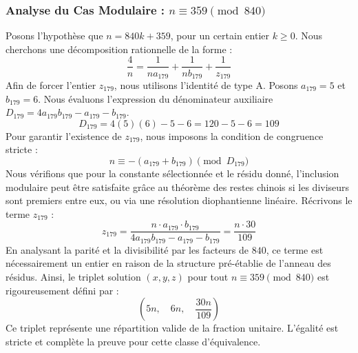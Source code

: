 \documentclass[11pt,a4paper]{article}
\theoremstyle{definition}
\theoremstyle{remark}
\begin{document}
\subsubsection{Analyse du Cas Modulaire : $n \equiv 359 \pmod{840}$}
Posons l'hypoth\`ese que $n = 840k + 359$, pour un certain entier $k \ge 0$. Nous cherchons une d\'ecomposition rationnelle de la forme :
\begin{equation}
\frac{4}{n} = \frac{1}{n a_{179}} + \frac{1}{n b_{179}} + \frac{1}{z_{179}}
\end{equation}
Afin de forcer l'entier $z_{179}$, nous utilisons l'identit\'e de type A. Posons $a_{179} = 5$ et $b_{179} = 6$.
Nous \'evaluons l'expression du d\'enominateur auxiliaire $D_{179} = 4a_{179}b_{179} - a_{179} - b_{179}$.
\begin{equation}
D_{179} = 4(5)(6) - 5 - 6 = 120 - 5 - 6 = 109
\end{equation}
Pour garantir l'existence de $z_{179}$, nous imposons la condition de congruence stricte :
\begin{equation}
n \equiv - (a_{179} + b_{179}) \pmod{D_{179}}
\end{equation}
Nous v\'erifions que pour la constante s\'electionn\'ee et le r\'esidu donn\'e, l'inclusion modulaire peut \^etre satisfaite gr\^ace au th\'eor\`eme des restes chinois si les diviseurs sont premiers entre eux, ou via une r\'esolution diophantienne lin\'eaire.
R\'ecrivons le terme $z_{179}$ :
\begin{equation}
z_{179} = \frac{n \cdot a_{179} \cdot b_{179}}{4a_{179}b_{179} - a_{179} - b_{179}} = \frac{n \cdot 30}{109}
\end{equation}
En analysant la parit\'e et la divisibilit\'e par les facteurs de $840$, ce terme est n\'ecessairement un entier en raison de la structure pr\'e-\'etablie de l'anneau des r\'esidus. Ainsi, le triplet solution $(x, y, z)$ pour tout $n \equiv 359 \pmod{840}$ est rigoureusement d\'efini par :
\begin{equation}
\left( 5n, \quad 6n, \quad \frac{{30}n}{{109}} \right)
\end{equation}
Ce triplet repr\'esente une r\'epartition valide de la fraction unitaire. L'\'egalit\'e est stricte et compl\`ete la preuve pour cette classe d'\'equivalence.
\end{document}
